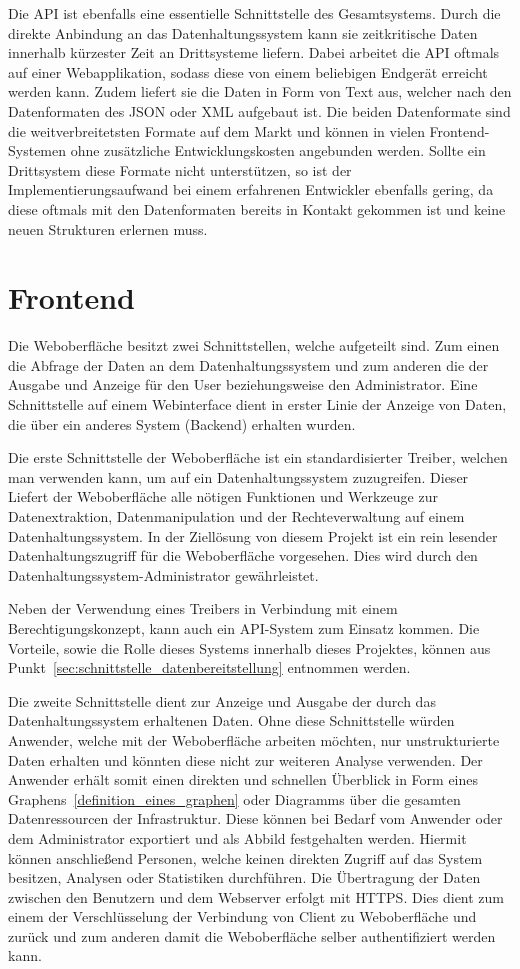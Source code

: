 Die API ist ebenfalls eine essentielle Schnittstelle des Gesamtsystems. Durch
die direkte Anbindung an das Datenhaltungssystem kann sie zeitkritische Daten
innerhalb kürzester Zeit an Drittsysteme liefern. Dabei arbeitet die API
oftmals auf einer Webapplikation, sodass diese von einem beliebigen Endgerät
erreicht werden kann. Zudem liefert sie die Daten in Form von Text aus, welcher
nach den Datenformaten des \gls{JSON} oder \gls{XML} aufgebaut ist. Die beiden
Datenformate sind die weitverbreitetsten Formate auf dem Markt und können in
vielen Frontend-Systemen ohne zusätzliche Entwicklungskosten angebunden
werden. Sollte ein Drittsystem diese Formate nicht unterstützen, so ist der
Implementierungsaufwand bei einem erfahrenen Entwickler ebenfalls gering, da
diese oftmals mit den Datenformaten bereits in Kontakt gekommen ist und keine
neuen Strukturen erlernen muss.
\nl%

\section{Frontend}
Die Weboberfläche besitzt zwei Schnittstellen, welche aufgeteilt sind. Zum
einen die Abfrage der Daten an dem Datenhaltungssystem und zum anderen die der
Ausgabe und Anzeige für den User beziehungsweise den Administrator. Eine
Schnittstelle auf einem Webinterface dient in erster Linie der Anzeige von
Daten, die über ein anderes System (Backend) erhalten wurden.

Die erste Schnittstelle der Weboberfläche ist ein standardisierter Treiber,
welchen man verwenden kann, um auf ein Datenhaltungssystem zuzugreifen. Dieser
Liefert der Weboberfläche alle nötigen Funktionen und Werkzeuge zur
Datenextraktion, Datenmanipulation und der Rechteverwaltung auf einem
Datenhaltungssystem. In der Ziellösung von diesem Projekt ist ein rein
lesender Datenhaltungszugriff für die Weboberfläche vorgesehen. Dies wird durch
den Datenhaltungssystem-Administrator gewährleistet.

Neben der Verwendung eines Treibers in Verbindung mit einem
Berechtigungskonzept, kann auch ein API-System zum Einsatz kommen. Die
Vorteile, sowie die Rolle dieses Systems innerhalb dieses Projektes, können aus
Punkt~\ref{sec:schnittstelle_datenbereitstellung} entnommen werden.

Die zweite Schnittstelle dient zur Anzeige und Ausgabe der durch das
Datenhaltungssystem erhaltenen Daten. Ohne diese Schnittstelle würden Anwender,
welche mit der Weboberfläche arbeiten möchten, nur unstrukturierte Daten
erhalten und könnten diese nicht zur weiteren Analyse verwenden. Der Anwender
erhält somit einen direkten und schnellen Überblick in Form eines
Graphens~\ref{definition_eines_graphen} oder Diagramms über die gesamten
Datenressourcen der Infrastruktur. Diese können bei Bedarf vom Anwender oder
dem Administrator exportiert und als Abbild festgehalten werden. Hiermit können
anschließend Personen, welche keinen direkten Zugriff auf das System besitzen,
Analysen oder Statistiken durchführen. Die Übertragung der Daten zwischen den
Benutzern und dem Webserver erfolgt mit \gls{HTTPS}. Dies dient zum einem der
Verschlüsselung der Verbindung von Client zu Weboberfläche und zurück und zum
anderen damit die Weboberfläche selber authentifiziert werden kann.
\mr%

